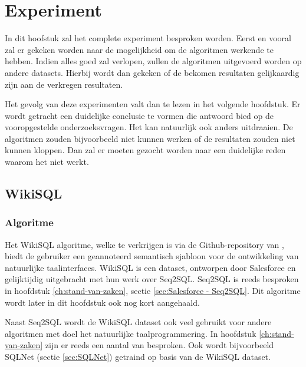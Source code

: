 
\chapter{Experiment}
\label{ch:experiment}

In dit hoofstuk zal het complete experiment besproken worden. Eerst en vooral zal er gekeken worden naar de mogelijkheid om de algoritmen werkende te hebben. Indien alles goed zal verlopen, zullen de algoritmen uitgevoerd worden op andere datasets. Hierbij wordt dan gekeken of de bekomen resultaten gelijkaardig zijn aan de verkregen resultaten. 

Het gevolg van deze experimenten valt dan te lezen in het volgende hoofdstuk. Er wordt getracht een duidelijke conclusie te vormen die antwoord bied op de vooropgestelde onderzoeksvragen. Het kan natuurlijk ook anders uitdraaien. De algoritmen zouden bijvoorbeeld niet kunnen werken of de resultaten zouden niet kunnen kloppen. Dan zal er moeten gezocht worden naar een duidelijke reden waarom het niet werkt.

\section{WikiSQL}

\subsection{Algoritme}

Het WikiSQL algoritme, welke te verkrijgen is via de Github-repository van \textcite{wikisql}, biedt de gebruiker een geannoteerd semantisch sjabloon voor de ontwikkeling van natuurlijke taalinterfaces. WikiSQL is een dataset, ontworpen door Salesforce en gelijktijdig uitgebracht met hun werk over Seq2SQL. Seq2SQL is reeds besproken in hoofdstuk \ref{ch:stand-van-zaken}, sectie \ref{sec:Salesforce - Seq2SQL}. Dit algoritme wordt later in dit hoofdstuk ook nog kort aangehaald.

Naast Seq2SQL wordt de WikiSQL dataset ook veel gebruikt voor andere algoritmen met doel het natuurlijke taalprogrammering. In hoofdstuk \ref{ch:stand-van-zaken} zijn er reeds een aantal van besproken. Ook wordt bijvoorbeeld SQLNet (sectie \ref{sec:SQLNet}) getraind op basis van de WikiSQL dataset.

